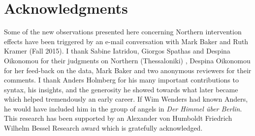 \documentclass[output=paper]{LSP/langsci}
\begin{document}
\section*{Acknowledgments}

Some of the new observations presented here concerning Northern  intervention effects have been triggered by an e-mail conversation with Mark Baker and Ruth Kramer (Fall 2015). I thank Sabine Iatridou, Giorgos Spathas and Despina Oikonomou for their judgments on Northern (Thessaloniki) , Despina Oikonomou for her feed-back on the data, Mark Baker and two anonymous reviewers for their comments. I thank Anders Holmberg for his many important contributions to syntax, his insights, and the generosity he showed towards what later became \citet{AlexiadouAnagnostopoulou1998} which helped tremendously an early career. If Wim Wenders had known Anders, he would have included him in the group of angels in \textit{Der Himmel über Berlin}. This research has been supported by an Alexander von Humboldt Friedrich Wilhelm Bessel Research award which is gratefully acknowledged.

\sloppy
\printbibliography[heading=subbibliography,notkeyword=this]
\end{document}
